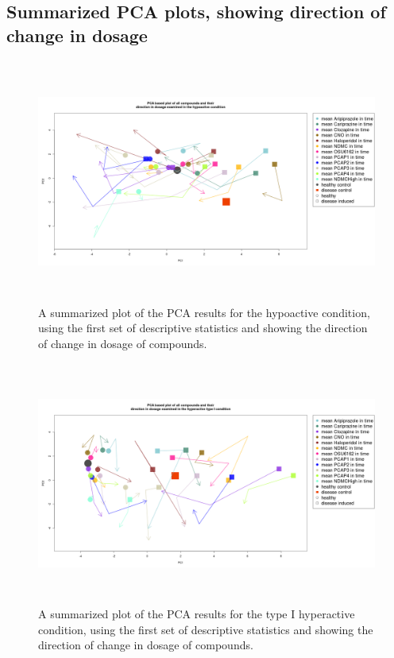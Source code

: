 \documentclass[a4paper,12pt]{article}
\begin{document}
\subsection{Summarized PCA plots, showing direction of change in dosage}
\begin{figure}[h!]
\begin{center}
\includegraphics[width=16cm,height=8cm]{All_together_doses_DarkApoLow.png}
\caption{A summarized plot of the PCA results for the hypoactive condition, using the first set of descriptive statistics and showing the direction of change in dosage of compounds.}
\end{center}
\end{figure}
\newpage

\begin{figure}[h!]
\begin{center}
\includegraphics[width=16cm,height=8cm]{All_together_doses_DarkApoHigh.png}
\caption{A summarized plot of the PCA results for the type I hyperactive condition, using the first set of descriptive statistics and showing the direction of change in dosage of compounds.}
\end{center}
\end{figure}
\newpage
\end{document}
